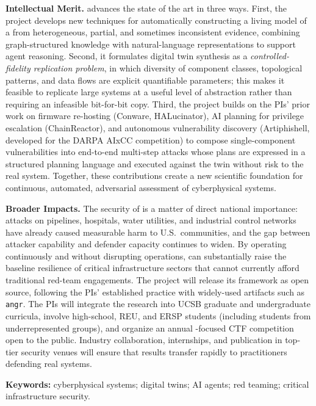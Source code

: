 \smallskip
\noindent\textbf{Intellectual Merit.}
\sysname advances the state of the art in three ways. First, the project
develops new techniques for automatically constructing a living model of
a \cps from heterogeneous, partial, and sometimes inconsistent evidence,
combining graph-structured knowledge with natural-language
representations to support agent reasoning. Second, it formulates digital
twin synthesis as a \emph{controlled-fidelity replication problem}, in
which diversity of component classes, topological patterns, and data
flows are explicit quantifiable parameters; this makes it feasible to
replicate large systems at a useful level of abstraction rather than
requiring an infeasible bit-for-bit copy. Third, the project builds on
the PIs' prior work on firmware re-hosting (Conware, HALucinator), AI
planning for privilege escalation (ChainReactor), and autonomous
vulnerability discovery (Artiphishell, developed for the DARPA AIxCC
competition) to compose single-component vulnerabilities into end-to-end
multi-step attacks whose plans are expressed in a structured planning
language and executed against the twin without risk to the real system.
Together, these contributions create a new scientific foundation for
continuous, automated, adversarial assessment of cyberphysical systems.

\smallskip
\noindent\textbf{Broader Impacts.}
The security of \CPSs is a matter of direct national importance:
attacks on pipelines, hospitals, water utilities, and industrial control
networks have already caused measurable harm to U.S.\ communities, and
the gap between attacker capability and defender capacity continues to
widen. By operating continuously and without disrupting operations,
\sysname can substantially raise the baseline resilience of critical
infrastructure sectors that cannot currently afford traditional
red-team engagements. The project will release its framework as open
source, following the PIs' established practice with widely-used
artifacts such as \texttt{angr}. The PIs will integrate the research
into UCSB graduate and undergraduate curricula, involve high-school,
REU, and ERSP students (including students from underrepresented
groups), and organize an annual \cps-focused CTF competition open to
the public. Industry collaboration, internships, and publication in
top-tier security venues will ensure that results transfer rapidly to
practitioners defending real systems.

\smallskip
\noindent\textbf{Keywords:} cyberphysical systems; digital twins;
AI agents; red teaming; critical infrastructure security.
